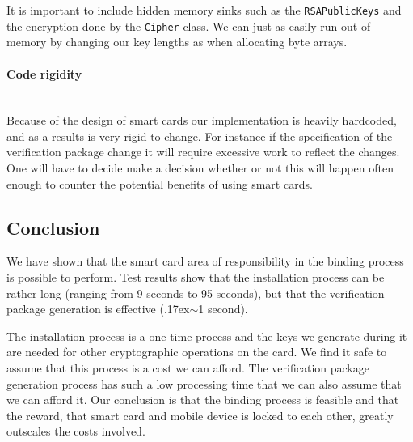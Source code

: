 It is important to include hidden memory sinks such as the \texttt{RSAPublicKeys} and the encryption done by the \texttt{Cipher} class. We can just as easily run out of memory by changing our key lengths as when allocating byte arrays.

\paragraph{Code rigidity}\mbox{}\\
Because of the design of smart cards our implementation is heavily hardcoded, and as a results is very rigid to change. For instance if the specification of the verification package change it will require excessive work to reflect the changes. One will have to decide make a decision whether or not this will happen often enough to counter the potential benefits of using smart cards.

\subsection{Conclusion}
We have shown that the smart card area of responsibility in the binding process is possible to perform. Test results show that the installation process can be rather long (ranging from 9 seconds to 95 seconds), but that the verification package generation is effective ({\raise.17ex\hbox{$\scriptstyle\sim$}}1 second).

The installation process is a one time process and the keys we generate during it are needed for other cryptographic operations on the card. We find it safe to assume that this process is a cost we can afford. The verification package generation process has such a low processing time that we can also assume that we can afford it. Our conclusion is that the binding process is feasible and that the reward, that smart card and mobile device is locked to each other, greatly outscales the costs involved.
